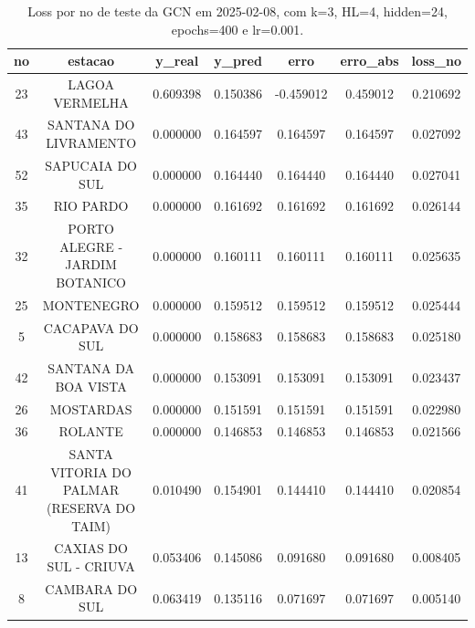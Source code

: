 \begin{table}[h]
\centering
\caption{Loss por no de teste da GCN em 2025-02-08, com k=3, HL=4, hidden=24, epochs=400 e lr=0.001.}
\label{tab:gcn_loss_k3_hl4_h24_e400_d20250208}
\begin{tabular}{ccccccc}
\toprule
no & estacao & y\_real & y\_pred & erro & erro\_abs & loss\_no \\
\midrule
23 & LAGOA VERMELHA & 0.609398 & 0.150386 & -0.459012 & 0.459012 & 0.210692 \\
43 & SANTANA DO LIVRAMENTO & 0.000000 & 0.164597 & 0.164597 & 0.164597 & 0.027092 \\
52 & SAPUCAIA DO SUL & 0.000000 & 0.164440 & 0.164440 & 0.164440 & 0.027041 \\
35 & RIO PARDO & 0.000000 & 0.161692 & 0.161692 & 0.161692 & 0.026144 \\
32 & PORTO ALEGRE - JARDIM BOTANICO & 0.000000 & 0.160111 & 0.160111 & 0.160111 & 0.025635 \\
25 & MONTENEGRO & 0.000000 & 0.159512 & 0.159512 & 0.159512 & 0.025444 \\
5 & CACAPAVA DO SUL & 0.000000 & 0.158683 & 0.158683 & 0.158683 & 0.025180 \\
42 & SANTANA DA BOA VISTA & 0.000000 & 0.153091 & 0.153091 & 0.153091 & 0.023437 \\
26 & MOSTARDAS & 0.000000 & 0.151591 & 0.151591 & 0.151591 & 0.022980 \\
36 & ROLANTE & 0.000000 & 0.146853 & 0.146853 & 0.146853 & 0.021566 \\
41 & SANTA VITORIA DO PALMAR (RESERVA DO TAIM) & 0.010490 & 0.154901 & 0.144410 & 0.144410 & 0.020854 \\
13 & CAXIAS DO SUL - CRIUVA & 0.053406 & 0.145086 & 0.091680 & 0.091680 & 0.008405 \\
8 & CAMBARA DO SUL & 0.063419 & 0.135116 & 0.071697 & 0.071697 & 0.005140 \\
\bottomrule
\end{tabular}
\end{table}
